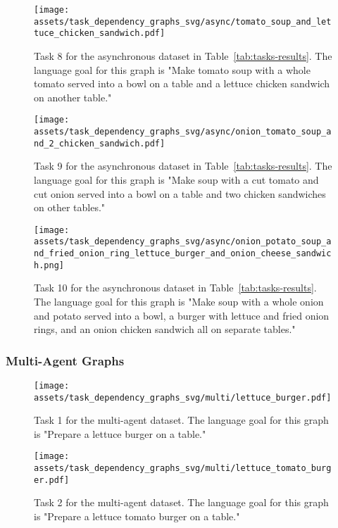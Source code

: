 \begin{figure}[H]
    \centering
    \texttt{[image: assets/task\_dependency\_graphs\_svg/async/tomato\_soup\_and\_lettuce\_chicken\_sandwich.pdf]}
    \caption{Task 8 for the asynchronous dataset in Table~\ref{tab:tasks-results}. The language goal for this graph is "Make tomato soup with a whole tomato served into a bowl on a table and a lettuce chicken sandwich on another table."}
    \label{fig:7_async}
\end{figure}

\begin{figure}[H]
    \centering
    \texttt{[image: assets/task\_dependency\_graphs\_svg/async/onion\_tomato\_soup\_and\_2\_chicken\_sandwich.pdf]}
    \caption{Task 9 for the asynchronous dataset in Table~\ref{tab:tasks-results}. The language goal for this graph is "Make soup with a cut tomato and cut onion served into a bowl on a table and two chicken sandwiches on other tables."}
    \label{fig:8_async}
\end{figure}

\begin{figure}[H]
    \centering
    \texttt{[image: assets/task\_dependency\_graphs\_svg/async/onion\_potato\_soup\_and\_fried\_onion\_ring\_lettuce\_burger\_and\_onion\_cheese\_sandwich.png]}
    \caption{Task 10 for the asynchronous dataset in Table~\ref{tab:tasks-results}. The language goal for this graph is "Make soup with a whole onion and potato served into a bowl, a burger with lettuce and fried onion rings, and an onion chicken sandwich all on separate tables."}
    \label{fig:9_async}
\end{figure}

\subsubsection{Multi-Agent Graphs}
\begin{figure}[H]
    \centering
    \texttt{[image: assets/task\_dependency\_graphs\_svg/multi/lettuce\_burger.pdf]}
    \caption{Task 1 for the multi-agent dataset. The language goal for this graph is "Prepare a lettuce burger on a table."}
    \label{0_multi}
\end{figure}

\begin{figure}[H]
    \centering
    \texttt{[image: assets/task\_dependency\_graphs\_svg/multi/lettuce\_tomato\_burger.pdf]}
    \caption{Task 2 for the multi-agent dataset. The language goal for this graph is "Prepare a lettuce tomato burger on a table."}
    \label{1_multi}
\end{figure}

